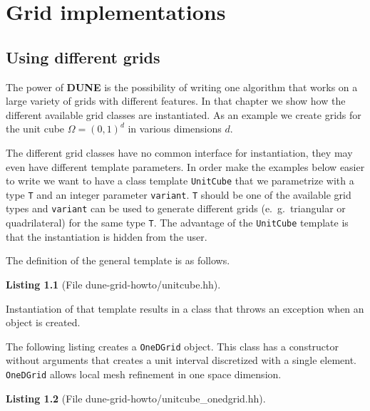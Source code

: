 \documentclass[11pt,a4paper,headinclude,footinclude,DIV16,normalheadings]{scrreprt}
\newcommand{\Dune}{{\sf\bfseries DUNE}\xspace}
\newtheorem{lst}{Listing}
\begin{document}
\chapter{Grid implementations}

\section{Using different grids}

The power of \Dune{} is the possibility of writing one algorithm that
works on a large variety of grids with different
features. In that chapter we show how the different available grid
classes are instantiated. As an example we create grids for the unit
cube $\Omega=(0,1)^d$ in various dimensions $d$.

The different grid classes have no common interface for instantiation,
they may even have different template parameters. In order make the
examples below easier to write we want to have a class template
\lstinline!UnitCube! that we parametrize with a type \lstinline!T! and
an integer parameter \lstinline!variant!. \lstinline!T! should be
one of the available grid types and \lstinline!variant! can be used to
generate different grids (e.~g.~triangular or quadrilateral) for the
same type \lstinline!T!. The advantage of the \lstinline!UnitCube!
template is that the instantiation is hidden from the user.

The definition of the general template is as follows.

\begin{lst}[File dune-grid-howto/unitcube.hh] \mbox{}
\nopagebreak

\end{lst}

Instantiation of that template results in a class that throws an
exception when an object is created.


The following listing creates a \lstinline!OneDGrid! object. This
class has a constructor without arguments that creates a unit
interval discretized with a single element. \lstinline!OneDGrid!
allows local mesh refinement in one space dimension.

\begin{lst}[File dune-grid-howto/unitcube\_onedgrid.hh] \mbox{}
\nopagebreak

\end{lst}
\end{document}
